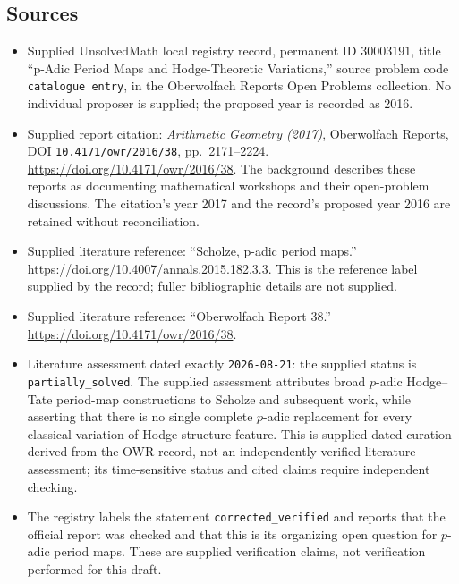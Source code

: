 \documentclass[11pt]{article}
\begin{document}
\subsection{Sources}
\begin{itemize}
\item Supplied UnsolvedMath local registry record, permanent ID \(30003191\), title ``p-Adic Period Maps and Hodge-Theoretic Variations,'' source problem code \texttt{catalogue entry}, in the Oberwolfach Reports Open Problems collection. No individual proposer is supplied; the proposed year is recorded as 2016.
\item Supplied report citation: \emph{Arithmetic Geometry (2017)}, Oberwolfach Reports, DOI \texttt{10.4171/owr/2016/38}, pp.\ 2171--2224. \url{https://doi.org/10.4171/owr/2016/38}. The background describes these reports as documenting mathematical workshops and their open-problem discussions. The citation's year 2017 and the record's proposed year 2016 are retained without reconciliation.
\item Supplied literature reference: ``Scholze, p-adic period maps.'' \url{https://doi.org/10.4007/annals.2015.182.3.3}. This is the reference label supplied by the record; fuller bibliographic details are not supplied.
\item Supplied literature reference: ``Oberwolfach Report 38.'' \url{https://doi.org/10.4171/owr/2016/38}.
\item Literature assessment dated exactly \texttt{2026-08-21}: the supplied status is \texttt{partially\_solved}. The supplied assessment attributes broad \(p\)-adic Hodge--Tate period-map constructions to Scholze and subsequent work, while asserting that there is no single complete \(p\)-adic replacement for every classical variation-of-Hodge-structure feature. This is supplied dated curation derived from the OWR record, not an independently verified literature assessment; its time-sensitive status and cited claims require independent checking.
\item The registry labels the statement \texttt{corrected\_verified} and reports that the official report was checked and that this is its organizing open question for \(p\)-adic period maps. These are supplied verification claims, not verification performed for this draft.
\end{itemize}
\end{document}
